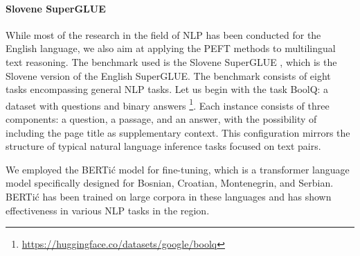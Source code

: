 \paragraph{Slovene SuperGLUE} While most of the research in the field of NLP has been conducted for the English language, we also aim at applying the PEFT methods to multilingual text reasoning. The benchmark used is the Slovene SuperGLUE \cite{robnik2022superglue}, which is the Slovene version of the English SuperGLUE. The benchmark consists of eight tasks encompassing general NLP tasks. Let us begin with the task BoolQ: a dataset with questions and binary answers \footnote{\url{https://huggingface.co/datasets/google/boolq}}. Each instance consists of three components: a question, a passage, and an answer, with the possibility of including the page title as supplementary context. This configuration mirrors the structure of typical natural language inference tasks focused on text pairs.

We employed the BERTić \cite{ljubesic2021bertic} model for fine-tuning, which is a transformer language model specifically designed for Bosnian, Croatian, Montenegrin, and Serbian. BERTić has been trained on large corpora in these languages and has shown effectiveness in various NLP tasks in the region.

\begin{table}[htbp]
  \centering
  \label{tab:comparison}
    \caption{Comparison of Full Fine Tuning (FFT) vs. LoRA }
\end{table}

